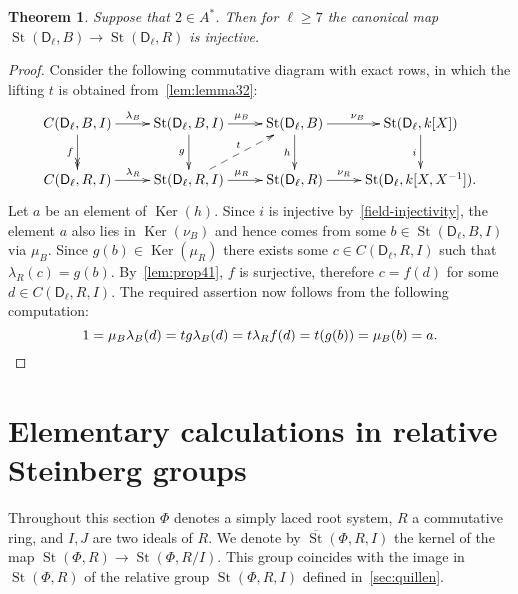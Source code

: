 \documentclass[oneside, 8pt]{amsart}
\newtheorem{theorem}{Theorem}
\theoremstyle{remark}
\theoremstyle{definition}
\numberwithin{lemma}{section}
\numberwithin{prop}{section}
\numberwithin{corollary}{section}
\numberwithin{externaltheorem}{section}
\DeclareMathOperator{\Ker}{Ker}
\DeclareMathOperator{\St}{St}
\newcommand{\rD}{\mathsf{D}}
\numberwithin{equation}{section}
\begin{document}
\begin{theorem} \label{thm41}
Suppose that $2 \in A^*$. Then for $\ell \geq 7$ the canonical map $\St(\rD_\ell, B) \to \St(\rD_\ell, R)$ is injective.
\end{theorem}
\begin{proof}
 Consider the following commutative diagram with exact rows, in which the lifting $t$ is obtained from~\cref{lem:lemma32}:
\begin{equation*} \xymatrix{
 C(\rD_\ell, B, I) \ar[r]^{\lambda_B} \ar@{->>}[d]_{f} & \St(\rD_\ell, B, I) \ar[r]^{\mu_B} \ar[d]_{g} &
 \St(\rD_\ell, B) \ar[r]^{\nu_B} \ar[d]_{h} & \St(\rD_\ell, k[X]) \ar[d]_{i} \\
 C(\rD_\ell, R, I) \ar[r]^{\lambda_R}         & \St(\rD_\ell, R, I) \ar[r]^{\mu_R} \ar@{-->}[ur]^{t}&
 \St(\rD_\ell, R) \ar[r]^-{\nu_R}        & \St(\rD_\ell, k[X, X^{-1}]).
}\end{equation*}
Let $a$ be an element of $\Ker(h)$. Since $i$ is injective by~\cref{field-injectivity}, the element $a$
 also lies in $\Ker(\nu_B)$ and hence comes from some $b \in \St(\rD_\ell, B, I)$ via $\mu_B$.
Since $g(b) \in \Ker(\mu_R)$ there exists some $c \in C(\rD_\ell, R, I)$ such that $\lambda_R(c) = g(b)$. 
By~\cref{lem:prop41}, $f$ is surjective, therefore $c = f(d)$ for some $d \in C(\rD_\ell, R, I)$.
The required assertion now follows from the following computation:
 \[ 1 = \mu_B\lambda_B(d) = tg\lambda_B(d) = t\lambda_Rf(d) =t(g(b)) = \mu_B(b) = a. \qedhere \]
\end{proof}

\section{Elementary calculations in relative Steinberg groups}
\begin{comment}
Hall-Witt identity
\[ [[ y^{-1}, x], z] ^ {y^{-1}}  [[ z^{-1}, y], x] ^ {z^{-1}}  [[ x^{-1}, z], y] ^ {x^{-1}} = 1 \]
\[ [[ y^{-1}, x], z]  \cdot [[ z^{-1}, y], x] ^ {z^{-1}y} \cdot  [[ x^{-1}, z], y] ^ {x^{-1}y} = 1. \]
\[ [[ z^{-1}, y^{-1}], x] ^ {z^{-1}y^{-1}} \cdot  [[ x^{-1}, z], y^{-1}] ^ {x^{-1}y^{-1}} = [z, [ y, x]] . \]
\[  . \]
\end{comment}
Throughout this section $\Phi$ denotes a simply laced root system, $R$ a commutative ring, and $I, J$ are two ideals of $R$. 
We denote by $\overline{\St}(\Phi, R, I)$ the kernel of the map $\St(\Phi, R) \to \St(\Phi, R/I)$.
This group coincides with the image in $\St(\Phi, R)$ of the relative group $\St(\Phi, R, I)$ defined in~\cref{sec:quillen}.
\end{document}
